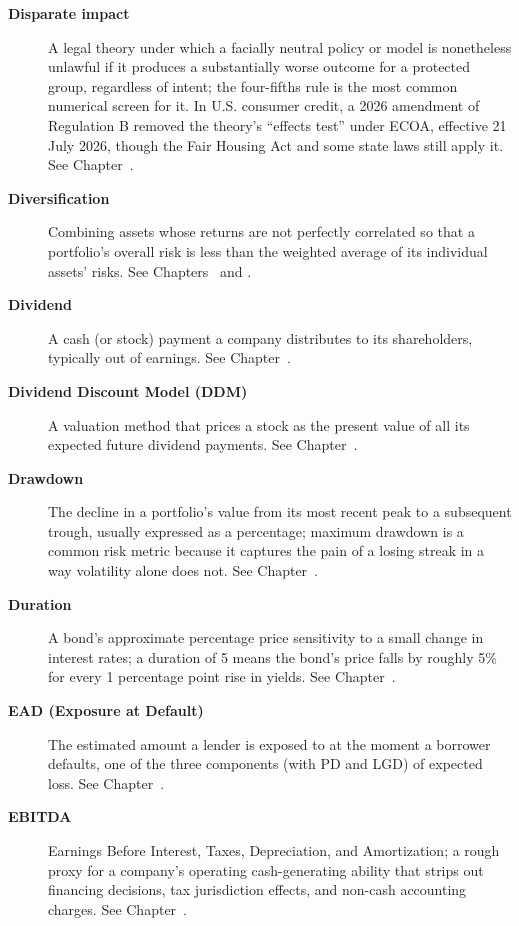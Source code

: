 \documentclass[../ai_in_finance]{subfiles}
\begin{document}
\begin{description}
\item[\textbf{Disparate impact}] A legal theory under which a facially neutral policy or model is nonetheless unlawful if it produces a substantially worse outcome for a protected group, regardless of intent; the four-fifths rule is the most common numerical screen for it. In U.S. consumer credit, a 2026 amendment of Regulation B removed the theory's ``effects test'' under ECOA, effective 21 July 2026, though the Fair Housing Act and some state laws still apply it. See Chapter~.

\item[\textbf{Diversification}] Combining assets whose returns are not perfectly correlated so that a portfolio's overall risk is less than the weighted average of its individual assets' risks. See Chapters~ and .

\item[\textbf{Dividend}] A cash (or stock) payment a company distributes to its shareholders, typically out of earnings. See Chapter~.

\item[\textbf{Dividend Discount Model (DDM)}] A valuation method that prices a stock as the present value of all its expected future dividend payments. See Chapter~.

\item[\textbf{Drawdown}] The decline in a portfolio's value from its most recent peak to a subsequent trough, usually expressed as a percentage; maximum drawdown is a common risk metric because it captures the pain of a losing streak in a way volatility alone does not. See Chapter~.

\item[\textbf{Duration}] A bond's approximate percentage price sensitivity to a small change in interest rates; a duration of 5 means the bond's price falls by roughly 5\% for every 1 percentage point rise in yields. See Chapter~.

\item[\textbf{EAD (Exposure at Default)}] The estimated amount a lender is exposed to at the moment a borrower defaults, one of the three components (with PD and LGD) of expected loss. See Chapter~.

\item[\textbf{EBITDA}] Earnings Before Interest, Taxes, Depreciation, and Amortization; a rough proxy for a company's operating cash-generating ability that strips out financing decisions, tax jurisdiction effects, and non-cash accounting charges. See Chapter~.


\end{description}
\end{document}
